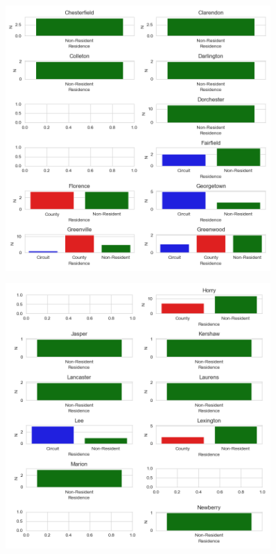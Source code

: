 \documentclass[11pt]{article}
\begin{document}
      \begin{figure}[H]
        \centering
        \includegraphics[width=0.9\textwidth]{../../../output/figures/Exploration/county_trial_hist_1.png}
      \end{figure}

      \begin{figure}[H]
        \centering
        \includegraphics[width=0.9\textwidth]{../../../output/figures/Exploration/county_trial_hist_2.png}
      \end{figure}
\end{document}
